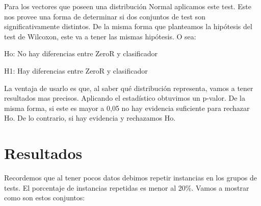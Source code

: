 
Para los vectores que poseen una distribución Normal aplicamos este test. Este nos provee una forma de determinar si dos conjuntos de test son significativamente distintos. De la misma forma que planteamos la hipótesis del test de Wilcoxon, este va a tener las mismas hipótesis. O sea: 

\vspace{0.5cm}
\hspace{2cm}Ho: No hay diferencias entre ZeroR y clasificador
\vspace{0.25cm}

\hspace{2cm}H1: Hay diferencias entre ZeroR y clasificador
\vspace{0.5cm}

La ventaja de usarlo es que, al saber qué distribución representa, vamos a tener resultados mas precisos. Aplicando el estadístico obtuvimos un p-valor. De la misma forma, si este es mayor a 0,05 no hay evidencia suficiente para rechazar Ho. De lo contrario, si hay evidencia y rechazamos Ho.

\section{Resultados}

Recordemos que al tener pocos datos debimos repetir instancias en los grupos de tests. El porcentaje de instancias repetidas es menor al 20\%. Vamos a mostrar como son estos conjuntos:

\begin{figure}[H]
\centering
\pgfplotsset{width=10cm, height=6cm}
\end{figure}

